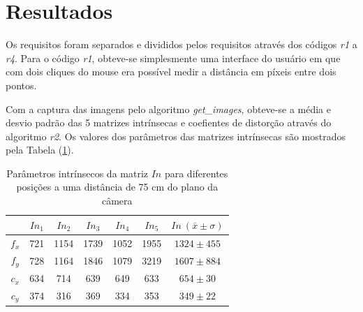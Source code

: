 \section{Resultados}
\label{resultados}


Os requisitos foram separados e divididos pelos requisitos através dos códigos \textit{r1} a \textit{r4}. Para o código \textit{r1}, obteve-se simplesmente uma interface do usuário em que com dois cliques do mouse era possível medir a distância em píxeis entre dois pontos.

Com a captura das imagens pelo algoritmo \textit{get\_images}, obteve-se a média e desvio padrão das 5 matrizes intrínsecas e coefientes de distorção através do algoritmo \textit{r2}. Os valores dos parâmetros das matrizes intrínsecas são mostrados pela Tabela (\ref{tab:intrisec}). 

\begin{table}[!ht]
\centering
\label{tab:intrisec}
\caption{Parâmetros intrínsecos da matriz $In$ para diferentes posições a uma distância de 75 cm do plano da câmera}
\begin{tabular}{c|c|c|c|c|c|c|}
\cline{2-7}
                            & $In_1$ & $In_2$ & $In_3$ & $In_4$ & $In_5$ & $In\ (\overline{x} \pm \sigma)$           \\ \hline
\multicolumn{1}{|c|}{$f_x$} & 721    & 1154   & 1739   & 1052   & 1955   & $1324 \pm 455$ \\ \hline
\multicolumn{1}{|c|}{$f_y$} & 728    & 1164   & 1846   & 1079   & 3219   & $1607 \pm 884$ \\ \hline
\multicolumn{1}{|c|}{$c_x$} & 634    & 714    & 639    & 649    & 633    & $654 \pm 30$   \\ \hline
\multicolumn{1}{|c|}{$c_y$} & 374    & 316    & 369    & 334    & 353    & $349 \pm 22$   \\ \hline
\end{tabular}
\end{table}


